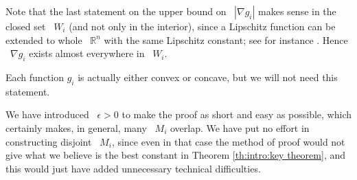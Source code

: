 \documentclass[reqno,12pt]{amsart}
\newcommand{\R}{\mathbb{R}}
\numberwithin{equation}{section}
\theoremstyle{plain}
\theoremstyle{definition}
\begin{document}
Note that the last statement on the upper bound on ~$|\nabla g_i|$ makes sense in the closed set ~$W_i$ (and not only in the interior), since a Lipschitz function can be extended to whole ~$\R^n$ with the same Lipschitz constant; see for instance \cite[Theorem 16.16]{CsatoDacKneuss}. Hence ~$\nabla g_i$ exists almost everywhere in ~$W_i$. 

Each function  $g_i$ is actually either convex or concave, but we will not need this statement.

We have introduced ~$\epsilon>0$ to make the proof as short and easy as possible, which certainly makes, in general,  many ~$M_i$ overlap. We have put no effort in constructing disjoint ~$M_i$, since even in that case  the method of proof would not give what we believe is the best constant in Theorem \ref{th:intro:key theorem}, and this would just have added unnecessary technical difficulties. 
\end{document}
